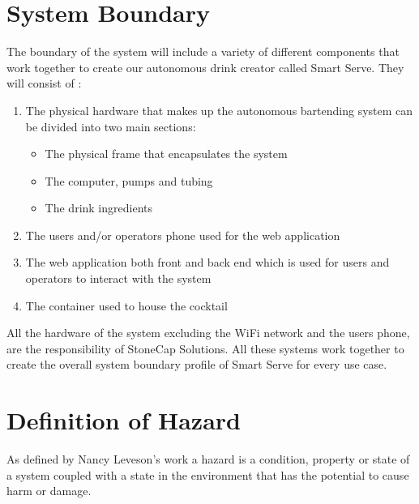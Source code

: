 \documentclass{article}
\begin{document}
\section{System Boundary}
    The boundary of the system will include a variety of different components that work together to create our autonomous drink creator called Smart Serve. They will consist of :
    \begin{enumerate}
    \item The physical hardware that makes up the autonomous bartending system can be divided into two main sections:
        \begin {itemize}
        \item The physical frame that encapsulates the system 
        \item The computer, pumps and tubing 
        \item The drink ingredients 
        \end{itemize}
    \item The users and/or operators phone used for the web application 
    \item The web application both front and back end which is used for users and operators to interact with the system
    \item The container used to house the cocktail 
    \end{enumerate}
    All the hardware of the system excluding the WiFi network and the users phone, are the responsibility of StoneCap Solutions. All these systems work together to create the overall system boundary profile of Smart Serve for every use case. 

\section{Definition of Hazard}
As defined by Nancy Leveson's work a hazard is a condition, property or state of a system coupled with a state in the environment that has the potential to cause harm or damage. %
    
\end{document}
